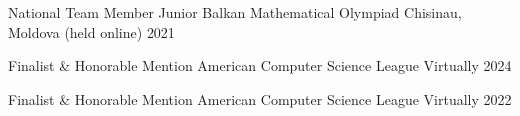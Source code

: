 



\begin{cvhonors}

  \cvhonor
    {National Team Member} %
    {Junior Balkan Mathematical Olympiad} %
    {Chisinau, Moldova (held online)} %
    {2021} %

  \cvhonor
    {Finalist \& Honorable Mention} %
    {American Computer Science League} %
    {Virtually} %
    {2024} %

  \cvhonor
    {Finalist \& Honorable Mention} %
    {American Computer Science League} %
    {Virtually} %
    {2022} %


\end{cvhonors}




